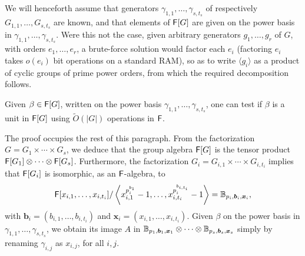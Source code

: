 We will henceforth assume that generators
$\gamma_{1,1},\dots,\gamma_{s,t_s}$ of respectively
$G_{1,1},\dots,G_{s,t_s}$ are known, and that elements of ${\mathsf{F}}[G]$ are
given on the power basis in $\gamma_{1,1},\dots,\gamma_{s,t_s}$. Were
this not the case, given arbitrary generators $g_1,\dots,g_r$ of $G$, with
orders $e_1,\dots,e_r$, a brute-force solution would factor each $e_i$
(factoring $e_i$ takes $o(e_i)$ bit operations on a standard RAM), so
as to write $\langle g_i \rangle$ as a product of cyclic groups of
prime power orders, from which the required decomposition follows.

\begin{proposition}
  Given $\beta \in {\mathsf{F}}[G]$, written on the power basis
  $\gamma_{1,1},\dots,\gamma_{s,t_s}$, one can test if $\beta$ is a
  unit in ${\mathsf{F}}[G]$ using $\tilde{O}(|G|)$ operations in ${\mathsf{F}}$.
\end{proposition}
The proof occupies the rest of this paragraph.
From the factorization $G = G_1 \times \cdots \times G_s$, we deduce
that the group algebra ${\mathsf{F}}[G]$ is the tensor product ${\mathsf{F}}[G_1]
\otimes \cdots \otimes {\mathsf{F}}[G_s]$. Furthermore, the 
factorization $G_i = G_{i,1} \times \cdots \times G_{i,t_i}$
implies that ${\mathsf{F}}[G_i]$ is isomorphic, as an ${\mathsf{F}}$-algebra, to
$${\mathsf{F}}[x_{i,1},\dots,x_{i,t_i}]/\left \langle
x_{i,1}^{p_i^{b_{1}}}-1,\dots,x_{i,t_i}^{p_i^{b_{i,t_i}}}-1\right\rangle
=\mathbb{B}_{p_i,\boldsymbol{b}_i,\boldsymbol{x}_i},$$ with $\boldsymbol{b}_i =
(b_{i,1},\dots,b_{i,t_i})$ and $\boldsymbol{x}_i =
(x_{i,1},\dots,x_{i,t_i})$. Given $\beta$ on the
power basis in $\gamma_{1,1},\dots,\gamma_{s,t_s}$, we obtain
its image 
$A$ in 
$\mathbb{B}_{p_1,\boldsymbol{b}_1,\boldsymbol{x}_1} \otimes \cdots \otimes 
\mathbb{B}_{p_s,\boldsymbol{b}_s,\boldsymbol{x}_s}$ simply 
by renaming $\gamma_{i,j}$ as $x_{i,j}$, for all $i,j$.

